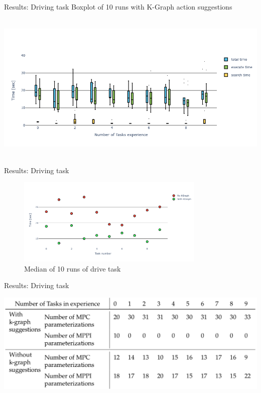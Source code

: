 \begin{frame}[fragile]{Results: Driving task} 
Boxplot of 10 runs with K-Graph action suggestions
\vspace{-1cm}
\begin{center}
  \hbox{\hspace{-0.7cm} \includegraphics[width=1.05\textwidth]{figures/results/random_drive_time_k-graph} }
\end{center}
\end{frame}

\begin{frame}[fragile]{Results: Driving task} 
\begin{center}
  \begin{figure}
  \includegraphics[width=0.8\textwidth]{figures/results/random_drive_time_vs}
  \caption{Median of 10 runs of drive task}
  \end{figure}
\end{center}
\end{frame}

\begin{frame}[fragile]{Results: Driving task} 
\begin{center}
\includegraphics[width=1.0\textwidth]{figures/results/random_drive_para}
\end{center}
\end{frame}

